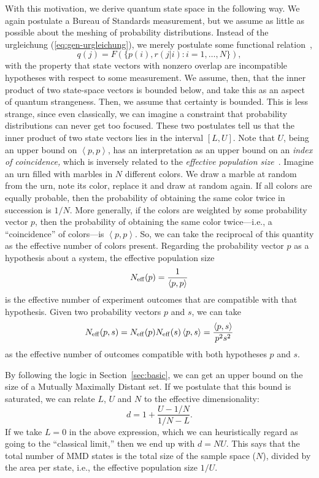 \documentclass[aps,pra,superscriptaddress,10pt,tightenlines,twocolumn,nofootinbib]{revtex4}
\theoremstyle{remark}
\newcommand{\inprod}[2]{{\left\langle #1 , #2 \right\rangle}}
\begin{document}
With this motivation, we derive quantum state space in the following way.  We again postulate a Bureau of Standards measurement, but we assume as little as possible about the meshing of probability distributions.  Instead of the urgleichung (\ref{eq:gen-urgleichung}), we merely postulate some functional relation~\cite{qbism-greeks},
\begin{equation}
q(j) = F\left(\{p(i), r(j|i): i = 1,\ldots,N\}\right),
\end{equation}
with the property that state vectors with nonzero overlap are incompatible hypotheses with respect to some measurement.  We assume, then, that the inner product of two state-space vectors is bounded below, and take this as an aspect of quantum strangeness.  Then, we assume that certainty is bounded.  This is less strange, since even classically, we can imagine a constraint that probability distributions can never get too focused.  These two postulates tell us that the inner product of two state vectors lies in the interval $[L, U]$.  Note that $U$, being an upper bound on $\inprod{p}{p}$, has an interpretation as an upper bound on an \emph{index of coincidence,} which is inversely related to the \emph{effective population size}~\cite{Leinster12, stacey-thesis, stacey-qutrit}.  Imagine an urn filled with marbles in $N$ different colors.  We draw a marble at random from the urn, note its color, replace it and draw at random again.  If all colors are equally probable, then the probability of obtaining the same color twice in succession is $1/N$.  More generally, if the colors are weighted by some probability vector $p$, then the probability of obtaining the same color twice---i.e., a ``coincidence'' of colors---is $\inprod{p}{p}$.  So, we can take the reciprocal of this quantity as the effective number of colors present.  Regarding the probability vector $p$ as a hypothesis about a system, the effective population size
\begin{equation}
N_{\rm eff}(p) = \frac{1}{\inprod{p}{p}}
\end{equation}
is the effective number of experiment outcomes that are compatible with that hypothesis.  Given two probability vectors $p$ and $s$, we can take
\begin{equation}
N_{\rm eff}(p,s) = N_{\rm eff}(p) N_{\rm eff}(s)\,\inprod{p}{s} = \frac{\inprod{p}{s}}{p^2 s^2}
\end{equation}
as the effective number of outcomes compatible with both hypotheses $p$ and $s$.

By following the logic in Section~\ref{sec:basic}, we can get an upper bound on the size of a Mutually Maximally Distant set.  If we postulate that this bound is saturated, we can relate $L$, $U$ and $N$ to the effective dimensionality:
\begin{equation}
d = 1 + \frac{U - 1/N}{1/N - L}.
\end{equation}
If we take $L = 0$ in the above expression, which we can heuristically
regard as going to the ``classical limit,'' then we end up with $d = NU$.  This
says that the total number of MMD states is the total size of the
sample space ($N$), divided by the area per state, i.e., the effective
population size $1/U$.
\end{document}
